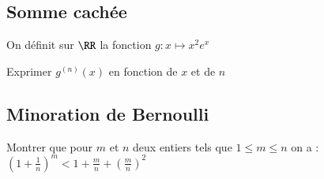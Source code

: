 \documentclass[oneside,12pt]{article}          %
\begin{document}
\subsection{Somme cachée}
On définit sur $\RR$ la fonction $g:x\mapsto x^2e^x$

Exprimer $g^{(n)}(x)$ en fonction de $x$ et de $n$



\subsection{Minoration de Bernoulli}
Montrer que pour $m$ et $n$ deux entiers tels que $1\leq m\leq n$ on a : $\left(1+\frac{1}{n}\right)^m<1+\frac{m}{n}+\left(\frac{m}{n}\right)^2$
\end{document}
